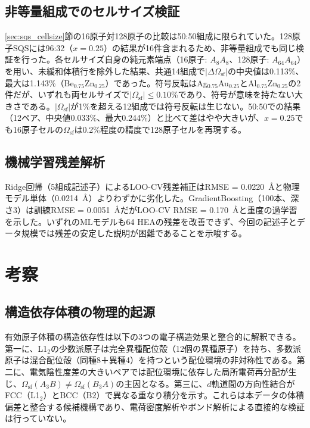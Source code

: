 \documentclass[5p,10pt]{elsarticle}
\begin{document}
\subsection{非等量組成でのセルサイズ検証}
\label{sec:cellsize_x25}

\ref{sec:sqs_cellsize}節の16原子対128原子の比較は50:50組成に限られていた。128原子SQSには96:32（$x = 0.25$）の結果が16件含まれるため、非等量組成でも同じ検証を行った。各セルサイズ自身の純元素端点（16原子: $A_8A_8$、128原子: $A_{64}A_{64}$）を用い、未緩和体積行を除外した結果、共通14組成で$|\Delta \Omega_\text{sf}|$の中央値は0.113\%、最大は1.143\%（Be$_{0.75}$Zn$_{0.25}$）であった。符号反転はAg$_{0.75}$Au$_{0.25}$とAl$_{0.75}$Zn$_{0.25}$の2件だが、いずれも両セルサイズで$|\Omega_\text{sf}| \le 0.10$\%であり、符号が意味を持たない大きさである。$|\Omega_\text{sf}|$が1\%を超える12組成では符号反転は生じない。50:50での結果（12ペア、中央値0.033\%、最大0.244\%）と比べて差はやや大きいが、$x = 0.25$でも16原子セルの$\Omega_\text{sf}$は0.2\%程度の精度で128原子セルを再現する。


\subsection{機械学習残差解析}
\label{sec:ml_results}

Ridge回帰（5組成記述子）によるLOO-CV残差補正はRMSE = 0.0220~\AA{}と物理モデル単体（0.0214~\AA）よりわずかに劣化した。GradientBoosting（100本、深さ3）は訓練RMSE = 0.0051~\AA{}だがLOO-CV RMSE = 0.170~\AA{}と重度の過学習を示した。いずれのMLモデルも64 HEAの残差を改善できず、今回の記述子とデータ規模では残差の安定した説明が困難であることを示唆する。


\section{考察}
\label{sec:discussion}

\subsection{構造依存体積の物理的起源}

有効原子体積の構造依存性は以下の3つの電子構造効果と整合的に解釈できる。第一に、L1$_2$の少数派原子は完全異種配位殻（12個の異種原子）を持ち、多数派原子は混合配位殻（同種8＋異種4）を持つという配位環境の非対称性である。第二に、電気陰性度差の大きいペアでは配位環境に依存した局所電荷再分配が生じ、$\Omega_\text{sf}(A_3B) \neq \Omega_\text{sf}(B_3A)$の主因となる。第三に、$d$軌道間の方向性結合がFCC（L1$_2$）とBCC（B2）で異なる重なり積分を示す。これらは本データの体積偏差と整合する候補機構であり、電荷密度解析やボンド解析による直接的な検証は行っていない。
\end{document}

